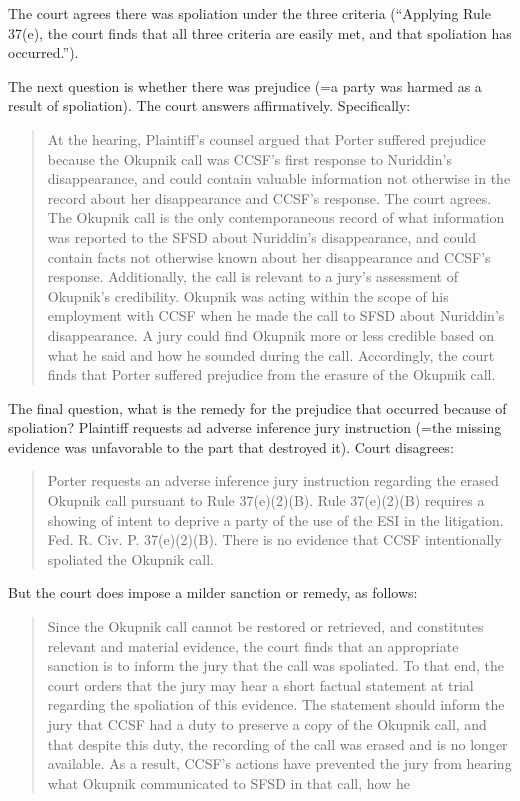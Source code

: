 \documentclass[
  10pt,
  dvipsnames,enabledeprecatedfontcommands]{scrartcl}
\begin{document}
The court agrees there was spoliation under the three criteria
(``Applying Rule 37(e), the court finds that all three criteria are
easily met, and that spoliation has occurred.'').

The next question is whether there was prejudice (=a party was harmed as
a result of spoliation). The court answers affirmatively. Specifically:

\begin{quote}
At the hearing, Plaintiff’s counsel argued that Porter suffered prejudice because the
Okupnik call was CCSF’s first response to Nuriddin’s disappearance, and could contain valuable
information not otherwise in the record about her disappearance and CCSF’s response. The court
agrees. The Okupnik call is the only contemporaneous record of what information was reported to
the SFSD about Nuriddin’s disappearance, and could contain facts not otherwise known about her
disappearance and CCSF’s response. Additionally, the call is relevant to a jury’s assessment of
Okupnik’s credibility. Okupnik was acting within the scope of his employment with CCSF when
he made the call to SFSD about Nuriddin’s disappearance. A jury could find Okupnik more or
less credible based on what he said and how he sounded during the call. Accordingly, the court
finds that Porter suffered prejudice from the erasure of the Okupnik call.
\end{quote}

The final question, what is the remedy for the prejudice that occurred
because of spoliation? Plaintiff requests ad adverse inference jury
instruction (=the missing evidence was unfavorable to the part that
destroyed it). Court disagrees:

\begin{quote}
Porter requests an adverse inference jury instruction regarding the erased Okupnik call
pursuant to Rule 37(e)(2)(B). Rule 37(e)(2)(B) requires a showing of intent to deprive a party of
the use of the ESI in the litigation. Fed. R. Civ. P. 37(e)(2)(B). There is no evidence that CCSF
intentionally spoliated the Okupnik call.
\end{quote}

But the court does impose a milder sanction or remedy, as follows:

\begin{quote}
Since the Okupnik call cannot be restored or retrieved, and constitutes
relevant and material evidence, the court finds that an appropriate sanction is to inform the jury
that the call was spoliated. To that end, the court orders that the jury may hear a short factual
statement at trial regarding the spoliation of this evidence. The statement should inform the jury
that CCSF had a duty to preserve a copy of the Okupnik call, and that despite this duty, the
recording of the call was erased and is no longer available. As a result, CCSF’s actions have
prevented the jury from hearing what Okupnik communicated to SFSD in that call, how he
\end{quote}
\end{document}

